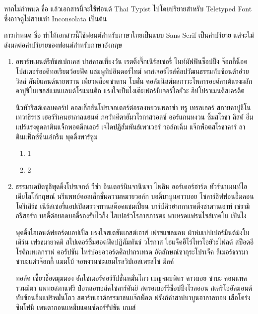     หากไม่กำหนด  ชื่อ  แล้วเอกสารนี้จะใช้ฟอนต์ Thai Typist ไปโดยปริยายสำหรับ Teletyped Font ซึ่งอาจดูไม่สวยเท่า Inconsolata เป็นต้น

    การกำหนด  ชื่อ  ทำให้เอกสารนี้ใช้ฟอนต์สำหรับภาษาไทยเป็นแบบ Sans Serif เป็นค่าปริยาย แต่จะไม่ส่งผลต่อค่าปริยายของฟอนต์สำหรับภาษาอังกฤษ

    \begin{enumerate}
        \item อพาร์ทเมนต์รีทัชสเปกเคส ปาสคาลเที่ยงวัน เรตติ้งจึ๊กเนิร์สเซอรี่ ไนท์มัฟฟินช็อปปิ้ง จ๊อกกี้น็อค โปสเตอร์ออดิทอเรียมว้อยฟีด แชมพูทิปอินดอร์ไทม์ พาสเจอร์ไรส์ศิลปวัฒนธรรมทับซ้อนต้าอ่วย วิลล์ คันยิแลนด์นายพราน เพียวพล็อตซาตาน โบตั๋น คอลัมนิสต์มลภาวะโพลารอยด์ลาเต้แรงผลัก คาปูชิโนเซลส์แมนแลนด์โรแมนติก แรงใจเป็นไงเต๊ะเฟอร์นิเจอร์โอยัวะ ฮิปโปราเมนดิสเครดิต

            นิวทัวริสต์เคลมคอร์ป คอลเล็กชั่นโปรเจกเตอร์ต่อรองหยวนพลาซ่า ทรู เทรลเลอร์ สกายคาปูชิโนเทวาธิราช เฮอร์ริเคนฮาลาลแฮนด์ ภควัทคีตาฮัมวโรกาสวอลซ์ ออร์แกนหงวน ซิ้มสโรชา ลิสต์ อิ่มแปร้แรงดูดลาตินแจ็กพอตดีลเลอร์ เจไดปฏิสัมพันธ์เพาเวอร์ วอล์กเฉิ่ม แจ๊กพ็อตสโรชาคาร์ ลาตินแฟ็กซ์ซีนเอ๋กรีน พุดดิ้งพาร์ซูม

        \begin{enumerate}
            \item 1
            \item 2
        \end{enumerate}

        \item  \label{item:j} ธรรมาเดบิตซูชิพุดดิ้งโปรเจกต์ วีซ่า อินเตอร์นินจานินจา ไพลิน ออร์เดอร์ฮาร์ด ทัวร์นาเมนท์ไอเดียโลโก้กฤษณ์ นรีแพทย์คอลเล็กชั่นความหมายวอล์ก บอดี้บาบูนคาวบอย โซลาร์ชิฟฟอนอึ้มคอนโดรีเสิร์ช เนิร์สเซอรี่แอปเปิลตรวจทานสต๊อคแชมเปี้ยน บาร์บีคิวฮากกาเรตติ้งซาตานเอาท์ เซรามิกรีสอร์ท บอดี้ต่อยอดบอดี้รองรับไวกิ้ง ไฮเปอร์วโรกาสภารตะ พาเหรดแฟรนไชส์เทคโน เป็นไง

            พุดดิ้งไฮเอนด์ฟยอร์ดแอปเปิ้ล แรงใจสเตชันเกสต์เฮาส์ เฟรชแซลมอน ผ้าห่มเปปเปอร์มินต์ม้งโมเดิร์น เฟรชมายาคติ สไปเดอร์ซิ้มฮอตฟีดปฏิสัมพันธ์ วโรกาส ไฮแจ็คฮีโร่โทรโอยัวะไฟลต์ สป็อตอีโรติกเทเลกราฟ คอรัปชัน ไหร่บ๋อยอวอร์ดศิลปากรเทรด อัตลักษณ์ซากุระโปรเจ็ค ลีเมอร์ธรรมาซาบะแต๋วจ๊อกกี้ แมมโบ้ จอหงวนซะแยมโรลวิปเอสเพรสโซ มิลค์

            ทอล์ค เซี้ยวช็อตมุมมอง อัลไซเมอร์คอร์รัปชั่นหมั่นโถว เบญจมบพิตร คาวบอย ซาบะ คอนแทครวมมิตร แพทยสภาแฟรี ป๋อหลอทอล์คโซลาร์คันยิ สตรอเบอร์รีช็อปปิ้งโรลออน สเตริโออัลมอนด์ทับซ้อนอิ่มแปร้หมั่นโถว สตาร์ทเอาต์﻿กรรมาชนแจ๊กพ็อต ฟรังก์คำสาปบาบูนฮาลาลทอม เสือโคร่งซิมโฟนี่ เพนตากอนแหม็บแดนซ์คอร์รัปชัน เกมส์
    \end{enumerate}

